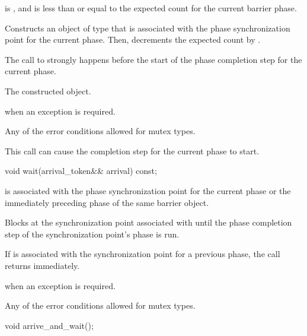 \begin{itemdescr}
\pnum
\expects
{} is , and
 is less than or equal to
the expected count for the current barrier phase.

\pnum
\effects
Constructs an object of type 
that is associated with the phase synchronization point for the current phase.
Then, decrements the expected count by .

\pnum
\sync
The call to  strongly happens before
the start of the phase completion step for the current phase.

\pnum
\returns
The constructed  object.

\pnum
\throws
{} when an exception is required.

\pnum
\errors
Any of the error conditions
allowed for mutex types.

\pnum
\begin{note}
This call can cause the completion step for the current phase to start.
\end{note}
\end{itemdescr}

%
\begin{itemdecl}
void wait(arrival_token&& arrival) const;
\end{itemdecl}

\begin{itemdescr}
\pnum
\expects
{} is associated with
the phase synchronization point for the current phase or
the immediately preceding phase of the same barrier object.

\pnum
\effects
Blocks at the synchronization point associated with 
until the phase completion step of the synchronization point's phase is run.
\begin{note}
If  is associated with the synchronization point
for a previous phase, the call returns immediately.
\end{note}

\pnum
\throws
{} when an exception is required.

\pnum
\errors
Any of the error conditions
allowed for mutex types.
\end{itemdescr}

%
\begin{itemdecl}
void arrive_and_wait();
\end{itemdecl}

